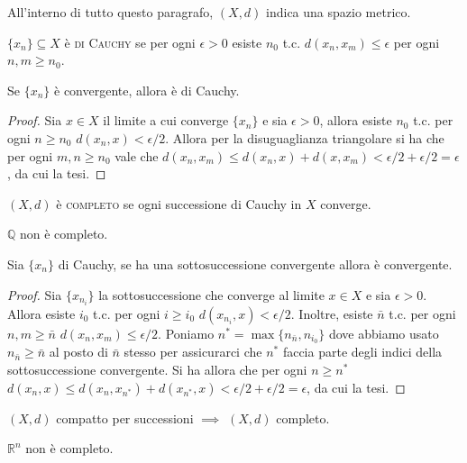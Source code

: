 All'interno di tutto questo paragrafo, $(X, d)$ indica una spazio metrico.

\begin{defn}
  $\{x_n\} \subseteq X$ è \textsc{di Cauchy} se per ogni $\epsilon>0$ esiste $n_0$ t.c. $d(x_n, x_m) \le \epsilon$ per ogni $n, m \ge n_0$.
\end{defn}

\begin{lm}
  Se $\{x_n\}$ è convergente, allora è di Cauchy.
\end{lm}

\begin{proof}
  Sia $x \in X$ il limite a cui converge $\{x_n\}$ e sia $\epsilon>0$, allora esiste $n_0$ t.c. per ogni $n \ge n_0$ $d(x_n, x) < \epsilon/2$. Allora per la disuguaglianza triangolare si ha che per ogni $m, n \ge n_0$ vale che $d(x_n, x_m) \le d(x_n, x)+d(x, x_m)<\epsilon/2+\epsilon/2=\epsilon$, da cui la tesi.
\end{proof}

\begin{defn}
  $(X, d)$ è \textsc{completo} se ogni successione di Cauchy in $X$ converge.
\end{defn}

\begin{ex}
  $\mathbb{Q}$ non è completo.
\end{ex}

\begin{lm}
  Sia $\{x_n\}$ di Cauchy, se ha una sottosuccessione convergente allora è convergente.
\end{lm}

\begin{proof}
  Sia $\{x_{n_i}\}$ la sottosuccessione che converge al limite $x \in X$ e sia $\epsilon>0$. Allora esiste $i_0$ t.c. per ogni $i \ge i_0$ $d(x_{n_i}, x) < \epsilon/2$. Inoltre, esiste $\bar{n}$ t.c. per ogni $n, m \ge \bar{n}$ $d(x_n, x_m) \le \epsilon/2$.
  Poniamo $n^*=\max{\{n_{\bar{n}}, n_{i_0}\}}$ dove abbiamo usato $n_{\bar{n}} \ge \bar{n}$ al posto di $\bar{n}$ stesso per assicurarci che $n^*$ faccia parte degli indici della sottosuccessione convergente.
  Si ha allora che per ogni $n \ge n^*$ $d(x_n, x) \le d(x_n, x_{n^*})+d(x_{n^*} , x)<\epsilon/2+\epsilon/2=\epsilon$, da cui la tesi.
\end{proof}

\begin{cor}
  $(X, d)$ compatto per successioni $\implies$ $(X, d)$ completo.
\end{cor}

\begin{ex}
  $\mathbb{R}^n$ non è completo.
\end{ex}
